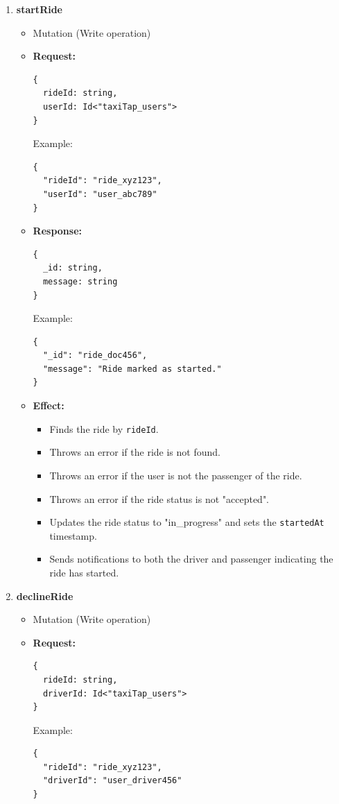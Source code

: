 \documentclass[a4paper,12pt]{article}
\begin{document}
\begin{enumerate}
\item \textbf{startRide}
  \begin{itemize}
    \item Mutation (Write operation)
    \item \textbf{Request:}
    \begin{verbatim}
{
  rideId: string,
  userId: Id<"taxiTap_users">
}
    \end{verbatim}
    Example:
    \begin{verbatim}
{
  "rideId": "ride_xyz123",
  "userId": "user_abc789"
}
    \end{verbatim}
    \item \textbf{Response:}
    \begin{verbatim}
{
  _id: string,
  message: string
}
    \end{verbatim}
    Example:
    \begin{verbatim}
{
  "_id": "ride_doc456",
  "message": "Ride marked as started."
}
    \end{verbatim}
    \item \textbf{Effect:}
    \begin{itemize}
      \item Finds the ride by \texttt{rideId}.
      \item Throws an error if the ride is not found.
      \item Throws an error if the user is not the passenger of the ride.
      \item Throws an error if the ride status is not "accepted".
      \item Updates the ride status to "in_progress" and sets the \texttt{startedAt} timestamp.
      \item Sends notifications to both the driver and passenger indicating the ride has started.
    \end{itemize}
  \end{itemize} 

  \item \textbf{declineRide}
  \begin{itemize}
    \item Mutation (Write operation)
    
    \item \textbf{Request:}
    \begin{verbatim}
{
  rideId: string,
  driverId: Id<"taxiTap_users">
}
    \end{verbatim}
    Example:
    \begin{verbatim}
{
  "rideId": "ride_xyz123",
  "driverId": "user_driver456"
}
    \end{verbatim}
    

\end{itemize}
\end{enumerate}
\end{document}
